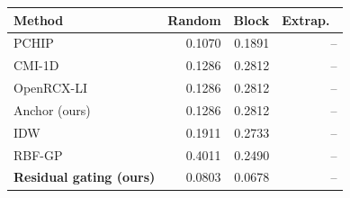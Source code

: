 \small
\begin{tabular}{lrrr}\toprule
Method & Random & Block & Extrap.\ \\\midrule
PCHIP & 0.1070 & 0.1891 & -- \\
CMI-1D & 0.1286 & 0.2812 & -- \\
OpenRCX-LI & 0.1286 & 0.2812 & -- \\
Anchor (ours) & 0.1286 & 0.2812 & -- \\
IDW & 0.1911 & 0.2733 & -- \\
RBF-GP & 0.4011 & 0.2490 & -- \\
\textbf{Residual gating (ours)} & 0.0803 & 0.0678 & -- \\
\bottomrule\end{tabular}
